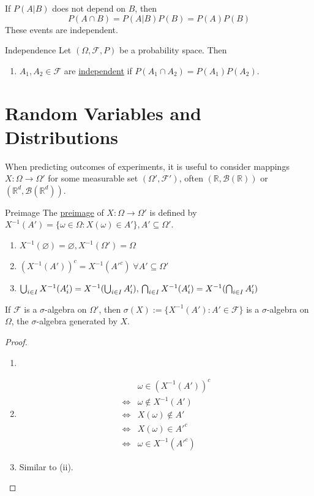 \documentclass{article}
\newcommand{\R}{\mathbb{R}}
\begin{document}
	If $P(A|B)$ does not depend on $B$, then $$P(A\cap B)=P(A|B)P(B)=P(A)P(B)$$
	These events are independent.
	\begin{mydef}{Independence}{}
		Let $(\Omega, \mathcal{F}, P)$ be a probability space. Then
		\begin{enumerate}[label=(\roman*)]
			\item $A_1, A_2\in\mathcal{F}$ are \underline{independent} if $P(A_1\cap A_2)=P(A_1)P(A_2)$.
		\end{enumerate}
	\end{mydef}
	
	\newpage
	\section{Random Variables and Distributions}
	When predicting outcomes of experiments, it is useful to consider mappings $X : \Omega\to\Omega'$ for some measurable set $(\Omega', \mathcal{F}')$, often $(\R, \mathcal{B}(\R))$ or $(\R^d, \mathcal{B}(\R^d))$.
	
	\begin{mydef}{Preimage}{}
		The \underline{preimage} of $X : \Omega\to\Omega'$ is defined by $X^{-1}(A')=\{\omega\in\Omega : X(\omega)\in A'\}, A'\subseteq\Omega'$.
	\end{mydef}
	
	\begin{mylem}{}{}
		\begin{enumerate}[label=(\roman*)]
			\item $X^{-1}(\varnothing)=\varnothing, X^{-1}(\Omega')=\Omega$
			\item $(X^{-1}(A'))^c=X^{-1}(A'^c)\;\forall A'\subseteq\Omega'$
			\item
			$\bigcup_{i\in I}X^{-1}(A_i')=X^{-1}(\bigcup_{i\in I}A_i'),\\
			\bigcap_{i\in I}X^{-1}(A_i')=X^{-1}(\bigcap_{i\in I}A_i')$
		\end{enumerate}
		
		If $\mathcal{F}$ is a $\sigma$-algebra on $\Omega'$, then $\sigma(X):=\{X^{-1}(A') : A'\in\mathcal{F}\}$ is a $\sigma$-algebra on $\Omega$, the $\sigma$-algebra generated by $X$.
		
		\begin{proof}~
			\begin{enumerate}
				\item ~
				\item
				\begin{align*}
					&\omega\in(X^{-1}(A'))^c\\
					\Leftrightarrow&\omega\notin X^{-1}(A')\\
					\Leftrightarrow&X(\omega)\notin A'\\
					\Leftrightarrow&X(\omega)\in A'^c\\
					\Leftrightarrow&\omega\in X^{-1}(A'^c)
				\end{align*}
				\item Similar to (ii).
			\end{enumerate}
		\end{proof}
	\end{mylem}
	
\end{document}
